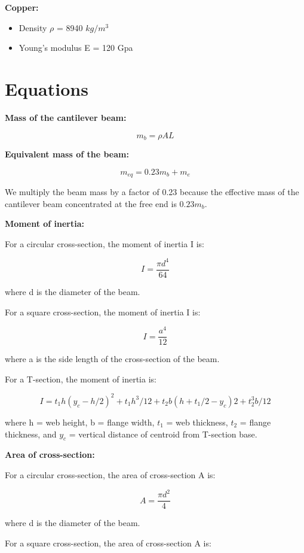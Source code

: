 \documentclass{report}
\begin{document}
{\bfseries Copper:}

\begin{itemize}
    \item Density $\rho$ = 8940 $kg/m^3$
    \item Young's modulus E = 120 Gpa
\end{itemize}

\section{Equations}

{\bfseries Mass of the cantilever beam:}

$$ m_b = \rho AL $$

{\bfseries Equivalent mass of the beam:}

$$ m_{eq} = 0.23m_b + m_e $$

We multiply the beam mass by a factor of 0.23 because the effective mass of the cantilever beam concentrated at the free end is $0.23m_b$.

\bigskip 

{\bfseries Moment of inertia:}

For a circular cross-section, the moment of inertia I is:

$$I = \frac{\pi d^4}{64}$$

where d is the diameter of the beam.

For a square cross-section, the moment of inertia I is:

$$ I = \frac{a^4}{12} $$

where a is the side length of the cross-section of the beam.

For a T-section, the moment of inertia is:

$$ I = t_1h(y_c-h/2)^2 + t_1h^3/12 + t_2b(h + t_1/2 - y_c)2 + t_2^3b/12 $$

where h = web height, b = flange width, $t_1$ = web thickness, $t_2$ = flange thickness, and $y_c$ = vertical distance of centroid from T-section base.

\bigskip

{\bfseries Area of cross-section:}

\bigskip

For a circular cross-section, the area of cross-section A is:

$$ A = \frac{\pi d^2}{4}$$

where d is the diameter of the beam.

For a square cross-section, the area of cross-section A is:
\end{document}
